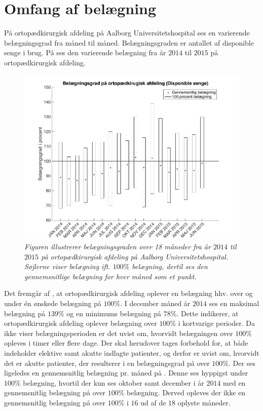 \section{Omfang af belægning}
På ortopædkirurgisk afdeling på Aalborg Universitetshospital ses en varierende belægningsgrad fra måned til måned. Belægningsgraden er antallet af disponible senge i brug. På  ses den varierende belægning fra år $2014$ til $2015$ på ortopædkirurgisk afdeling. \cite{SDS2015}


\begin{figure}[H]
	\flushleft 
	\centering
	\includegraphics[scale=.45]{figures/maxminoverbelaeg.png}

	\flushleft
	\caption{\textit{Figuren illustrerer belægningsgraden over 18 måneder fra år $2014$ til $2015$ på ortopædkirurgisk afdeling på Aalborg Universitetshospital. Søjlerne viser belægning ift. $100\%$ belægning, dertil ses den gennemsnitlige belægning for hver måned som et punkt. \cite{SDS2015}}}
	\label{maxminbelaeg}
\end{figure}


Det fremgår af , at ortopædkirurgisk afdeling oplever en belægning hhv. over og under én ønskede belægning på $100 \%$. I december måned år $2014$ ses en maksimal belægning på $139 \%$ og en minimums belægning på $78 \%$. Dette indikerer, at ortopædkirurgisk afdeling oplever belægning over $100 \%$ i kortvarige perioder. Da  ikke viser belægningsperioden er det uvist om, hvorvidt belægningen over $100 \%$ opleves i timer eller flere dage. Der skal herudover tages forbehold for, at  både indeholder elektive samt akutte indlagte patienter, og derfor er uvist om, hvorvidt det er akutte patienter, der resulterer i en belægningsgrad på over $100 \%$. Der ses ligeledes en gennemsnitlig belægning pr. måned på . Denne ses hyppigst under $100 \%$ belægning, hvortil der kun ses oktober samt december i år $2014$ med en gennemsnitlig belægning på over $100 \%$ belægning. Derved opleves der ikke en gennemsnitlig belægning på over $100 \%$ i $16$ ud af de $18$ oplyste måneder. \cite{SDS2015} 


